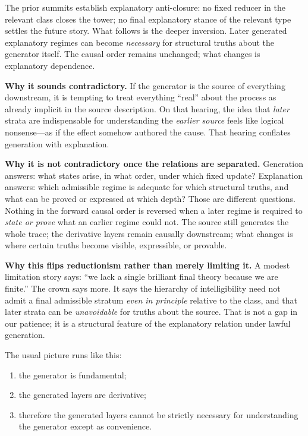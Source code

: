 \documentclass[11pt,a4paper]{article}
\theoremstyle{definition}
\begin{document}
The prior summits establish explanatory anti-closure: no fixed reducer in the relevant class closes the tower; no final explanatory stance of the relevant type settles the future story. What follows is the deeper inversion. Later generated explanatory regimes can become \emph{necessary} for structural truths about the generator itself. The causal order remains unchanged; what changes is explanatory dependence.

\medskip
\noindent
\textbf{Why it sounds contradictory.}
If the generator is the source of everything downstream, it is tempting to treat everything ``real'' about the process as already implicit in the source description. On that hearing, the idea that \emph{later} strata are indispensable for understanding the \emph{earlier source} feels like logical nonsense---as if the effect somehow authored the cause. That hearing conflates generation with explanation.

\medskip
\noindent
\textbf{Why it is not contradictory once the relations are separated.}
Generation answers: what states arise, in what order, under which fixed update? Explanation answers: which admissible regime is adequate for which structural truths, and what can be proved or expressed at which depth? Those are different questions. Nothing in the forward causal order is reversed when a later regime is required to \emph{state or prove} what an earlier regime could not. The source still generates the whole trace; the derivative layers remain causally downstream; what changes is where certain truths become visible, expressible, or provable.

\medskip
\noindent
\textbf{Why this flips reductionism rather than merely limiting it.}
A modest limitation story says: ``we lack a single brilliant final theory because we are finite.'' The crown says more. It says the hierarchy of intelligibility need not admit a final admissible stratum \emph{even in principle} relative to the class, and that later strata can be \emph{unavoidable} for truths about the source. That is not a gap in our patience; it is a structural feature of the explanatory relation under lawful generation.

\medskip
The usual picture runs like this:
\begin{enumerate}[leftmargin=2em]
\item the generator is fundamental;
\item the generated layers are derivative;
\item therefore the generated layers cannot be strictly necessary for understanding the generator except as convenience.
\end{enumerate}
\end{document}
